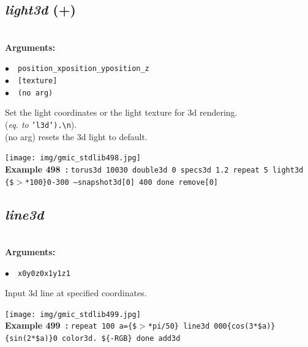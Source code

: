 \documentclass[a4paper,10.5pt,twoside]{book}
\def\comma{\discretionary{,}{}{,}}
\newcommand{\Cb}[1]{\textcolor{cb}{#1}}
\begin{document}
\subsection{\emph{light3d} (+)}\vspace*{-0.7em}
~\\\textbf{\Cb{Arguments: }}\begin{flushleft}
{\small \Cb{\hspace*{0.5cm}$\bullet$~~\texttt{position\_x{\comma}position\_y{\comma}position\_z}}}~~~\\
{\small \Cb{\hspace*{0.5cm}$\bullet$~~\texttt{[texture]}}}~~~\\
{\small \Cb{\hspace*{0.5cm}$\bullet$~~\texttt{(no arg)}}}\end{flushleft}
Set the light coordinates or the light texture for 3d rendering.
~\\(\emph{eq. to} {\small \texttt{'l3d').\textbackslash n}}).
~\\(no arg) resets the 3d light to default.
\begin{center}\texttt{[image: img/gmic\_stdlib498.jpg]}\\
{\footnotesize \textbf{Example 498~:} \texttt{torus3d 100{\comma}30 double3d 0 specs3d 1.2 repeat 5 light3d \{\$$>$*100\}{\comma}0{\comma}-300 --snapshot3d[0] 400 done remove[0]}}
\end{center}

\subsection{\emph{line3d} }\vspace*{-0.7em}
~\\\textbf{\Cb{Arguments: }}\begin{flushleft}
{\small \Cb{\hspace*{0.5cm}$\bullet$~~\texttt{x0{\comma}y0{\comma}z0{\comma}x1{\comma}y1{\comma}z1}}}\end{flushleft}
Input 3d line at specified coordinates.
\begin{center}\texttt{[image: img/gmic\_stdlib499.jpg]}\\
{\footnotesize \textbf{Example 499~:} \texttt{repeat 100 a=\{\$$>$*pi/50\} line3d 0{\comma}0{\comma}0{\comma}\{cos(3*\$a)\}{\comma}\{sin(2*\$a)\}{\comma}0 color3d. \$\{-RGB\} done add3d}}
\end{center}
\end{document}
